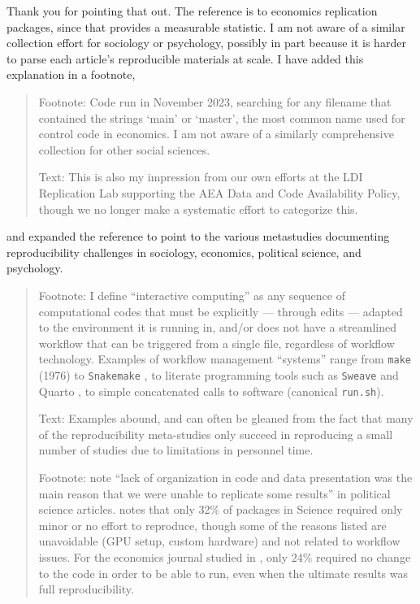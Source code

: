 \begin{response}
    Thank you for pointing that out. The reference is to economics replication packages, since that provides a measurable statistic. I am not aware of a similar collection effort for sociology or psychology, possibly in part because it is harder to parse each article's reproducible materials at scale. I have added this explanation in a footnote, 

    \begin{quote}
        Footnote: Code run in November 2023, searching for any filename that contained the strings `main' or `master', the most common name used for control code in economics. I am not aware of a similarly comprehensive collection for other social sciences. 
        
        \vspace{0.5em} \noindent Text: This is also my impression from our own efforts at the LDI Replication Lab supporting the AEA Data and Code Availability Policy, though we no longer make a systematic effort to categorize this. 
    \end{quote}
    
    
and expanded the reference to point to the various metastudies documenting reproducibility challenges in sociology, economics, political science, and psychology. 

    \begin{quote}
        Footnote: I define ``interactive computing'' as any sequence of computational codes that must be explicitly --- through edits --- adapted to the environment it is running in, and/or does not have a streamlined workflow that can be triggered from a single file, regardless of workflow technology. Examples of workflow management ``systems'' range from \texttt{make} (1976) \citep{association_for_computing_machinery_acm_2003} to \texttt{Snakemake} \citep{molder_sustainable_2021}, to literate programming tools such as \texttt{Sweave} \citep{Leisch2002SweaveDG} and Quarto \citep{Allaire_Quarto_2024}, to simple concatenated calls to software (canonical \texttt{run.sh}). 
        
        \vspace{0.5em} \noindent Text: Examples abound, and can often be gleaned from the fact that many of the reproducibility meta-studies only succeed in reproducing a small number of studies due to limitations in personnel time.

        \vspace{0.5em} \noindent Footnote: \citet{stockemer_data_2018} note ``lack of organization in code and data presentation was the main reason that we were unable to replicate some results'' in political science articles. \citet{StoddenPNAS2018} notes that only 32\% of packages in Science required only minor or no effort to reproduce, though some of the reasons listed are unavoidable (GPU setup, custom hardware) and not related to workflow issues. For the economics journal studied in \citet{herbert_reproduce_2024}, only 24\% required no change to the code in order to be able to run, even when the ultimate results was full reproducibility.
    \end{quote}


\end{response}


